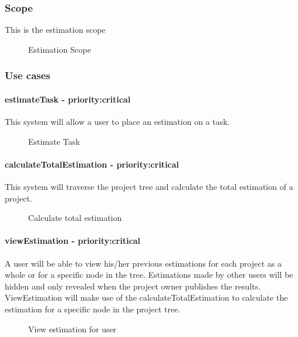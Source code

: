 \subsubsection{Scope}
	This is the estimation scope
	\begin{figure}[H]
	    	\centering
	    	\caption{Estimation Scope}
	    	\label{fig:Estimation_Scope}
   	\end{figure}
\subsubsection{Use cases}
	\paragraph{estimateTask - priority:critical}This system will allow a user to place an estimation on a task.
	\begin{figure}[H]
	    	\centering
	    	\caption{Estimate Task}
	    	\label{fig:Estimation_estimateTask.png}
   	\end{figure}
	\paragraph{calculateTotalEstimation - priority:critical}This system will traverse the project tree and calculate the total estimation of a project.
	\begin{figure}[H]
	    	\centering
	    	\caption{Calculate total estimation}
	    	\label{fig:Estimation_calculateTotalEstimation.png}
   	\end{figure}
	\paragraph{viewEstimation - priority:critical}A user will be able to view his/her previous estimations for each project as a whole or for a specific node in the tree. Estimations made by other users will be hidden and only revealed when the project owner publishes the results. ViewEstimation will make use of the calculateTotalEstimation to calculate the estimation for a specific node in the project tree.
	\begin{figure}[H]
	    	\centering
	    	\caption{View estimation for user}
	    	\label{fig:Estimation_viewEstimation.png}
   	\end{figure}
